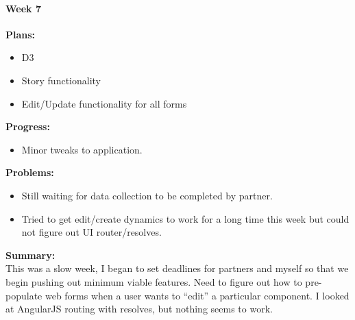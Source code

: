 \paragraph{Week 7}
\begin{adjustwidth}{2.5em}{0pt}
    \vspace{-0.5cm}\textbf{Plans:}
    \vspace{-0.5cm}
    \begin{itemize}
        \item D3
        \item Story functionality
        \item Edit/Update functionality for all forms
    \end{itemize} 
    \vspace{-0.3cm}\textbf{Progress:}
    \vspace{-0.5cm}
    \begin{itemize}
        \item Minor tweaks to application.
    \end{itemize} 
    \vspace{-0.3cm}\textbf{Problems:}
    \vspace{-0.5cm}
    \begin{itemize}
        \item Still waiting for data collection to be completed by partner.
        \item Tried to get edit/create dynamics to work for a long time this week but could not figure out UI router/resolves.
    \end{itemize}  
    \vspace{-0.3cm}\noindent\textbf{Summary:}\\
    \noindent This was a slow week, I began to set deadlines for partners and myself so that we begin pushing out minimum viable features. Need to figure out how to pre-populate web forms when a user wants to ``edit'' a particular component. I looked at AngularJS routing with resolves, but nothing seems to work. 
\end{adjustwidth} 
